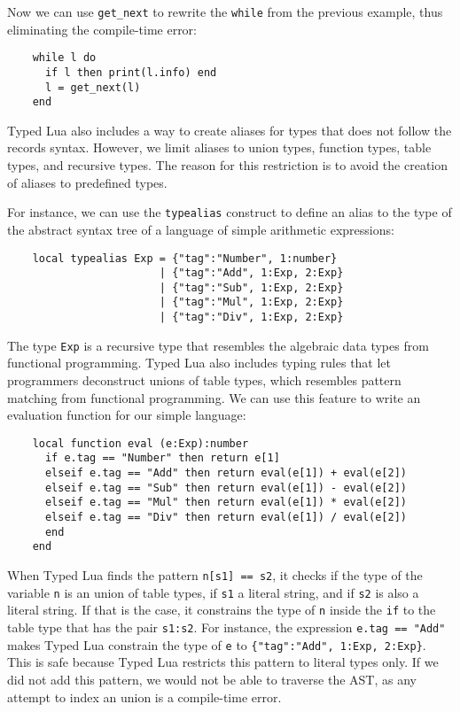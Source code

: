 Now we can use \texttt{get\string_next} to rewrite the \texttt{while}
from the previous example, thus eliminating the compile-time error:
\begin{verbatim}
    while l do
      if l then print(l.info) end
      l = get_next(l)
    end
\end{verbatim}

Typed Lua also includes a way to create aliases for types that does not
follow the records syntax.
However, we limit aliases to union types, function types, table types,
and recursive types.
The reason for this restriction is to avoid the creation of aliases
to predefined types.

For instance, we can use the \texttt{typealias} construct to define an
alias to the type of the abstract syntax tree of a language of simple
arithmetic expressions:
\begin{verbatim}
    local typealias Exp = {"tag":"Number", 1:number}
                        | {"tag":"Add", 1:Exp, 2:Exp}
                        | {"tag":"Sub", 1:Exp, 2:Exp}
                        | {"tag":"Mul", 1:Exp, 2:Exp}
                        | {"tag":"Div", 1:Exp, 2:Exp}
\end{verbatim}

The type \texttt{Exp} is a recursive type that resembles the
algebraic data types from functional programming.
Typed Lua also includes typing rules that let programmers
deconstruct unions of table types, which resembles
pattern matching from functional programming.
We can use this feature to write an evaluation function for
our simple language:
\begin{verbatim}
    local function eval (e:Exp):number
      if e.tag == "Number" then return e[1]
      elseif e.tag == "Add" then return eval(e[1]) + eval(e[2])
      elseif e.tag == "Sub" then return eval(e[1]) - eval(e[2])
      elseif e.tag == "Mul" then return eval(e[1]) * eval(e[2])
      elseif e.tag == "Div" then return eval(e[1]) / eval(e[2])
      end
    end
\end{verbatim}

When Typed Lua finds the pattern \texttt{n[s1] == s2}, it checks
if the type of the variable \texttt{n} is an union of table types,
if \texttt{s1} a literal string, and if \texttt{s2} is also a literal string.
If that is the case, it constrains the type of \texttt{n} inside
the \texttt{if} to the table type that has the pair \texttt{s1:s2}.
For instance, the expression \texttt{e.tag == "Add"} makes Typed Lua
constrain the type of \texttt{e} to \texttt{\{"tag":"Add", 1:Exp, 2:Exp\}}.
This is safe because Typed Lua restricts this pattern to literal types only.
If we did not add this pattern, we would not be able to traverse the AST,
as any attempt to index an union is a compile-time error.

